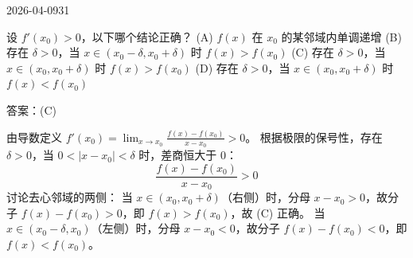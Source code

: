 \begin{mistake}{2026-04-09}{31}

\begin{problemcontent}
设 \( f'(x_0) > 0 \)，以下哪个结论正确？
(A) \( f(x) \) 在 \( x_0 \) 的某邻域内单调递增
(B) 存在 \( \delta > 0 \)，当 \( x \in (x_0-\delta, x_0+\delta) \) 时 \( f(x) > f(x_0) \)
(C) 存在 \( \delta > 0 \)，当 \( x \in (x_0, x_0+\delta) \) 时 \( f(x) > f(x_0) \)
(D) 存在 \( \delta > 0 \)，当 \( x \in (x_0, x_0+\delta) \) 时 \( f(x) < f(x_0) \)
\end{problemcontent}

\begin{solutioncontent}
答案：(C)

由导数定义 \( f'(x_0) = \lim_{x \to x_0} \frac{f(x)-f(x_0)}{x-x_0} > 0 \)。
根据极限的保号性，存在 \( \delta > 0 \)，当 \( 0 < |x-x_0| < \delta \) 时，差商恒大于 0：
\[
\frac{f(x)-f(x_0)}{x-x_0} > 0
\]
讨论去心邻域的两侧：
当 \( x \in (x_0, x_0+\delta) \)（右侧）时，分母 \( x-x_0 > 0 \)，故分子 \( f(x)-f(x_0) > 0 \)，即 \( f(x) > f(x_0) \)，故 (C) 正确。
当 \( x \in (x_0-\delta, x_0) \)（左侧）时，分母 \( x-x_0 < 0 \)，故分子 \( f(x)-f(x_0) < 0 \)，即 \( f(x) < f(x_0) \)。
\end{solutioncontent}


\end{mistake}
